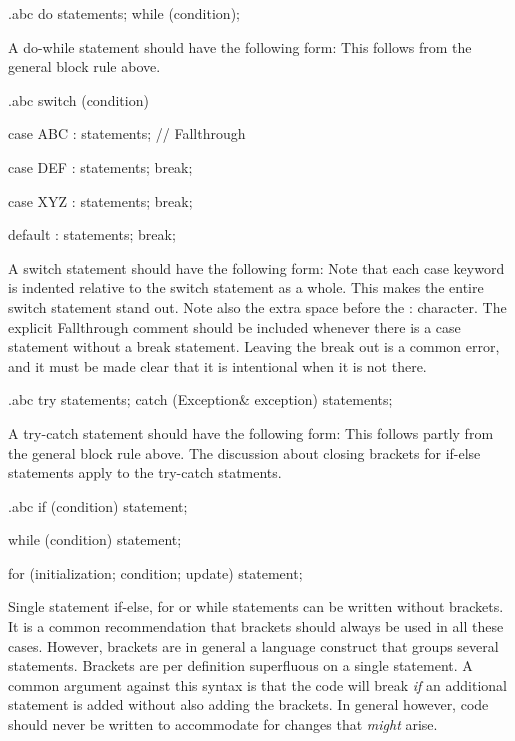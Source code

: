 \begin{filecontents*}{\jobname.abc}
	do {
	    statements;
	} while (condition);
\end{filecontents*}

\recommendation
{A do-while statement should have the following form:}
{}
{This follows from the general block rule above.}


\begin{filecontents*}{\jobname.abc}
	switch (condition) {
	    case ABC :
		    statements;
		    // Fallthrough
		
	    case DEF :
		    statements;
		    break;
		
	    case XYZ :
		    statements;
		    break;
		
	    default :
		    statements;
		    break;
	}
\end{filecontents*}

\recommendation
{A switch statement should have the following form:}
{}
{Note that each case keyword is indented relative to the switch statement as a whole. This makes the entire switch statement stand out. Note also the extra space before the : character. The explicit Fallthrough comment should be included whenever there is a case statement without a break statement. Leaving the break out is a common error, and it must be made clear that it is intentional when it is not there.}


\begin{filecontents*}{\jobname.abc}
	try {
	   statements;
	}
	catch (Exception& exception) {
	    statements;
	}
\end{filecontents*}

\recommendation
{A try-catch statement should have the following form:}
{}
{This follows partly from the general block rule above. The discussion about closing brackets for if-else statements apply to the try-catch statments.}


\begin{filecontents*}{\jobname.abc}
	if (condition)
	    statement;
	
	while (condition)
	    statement;
	
	for (initialization; condition; update)
	    statement;
\end{filecontents*}

\recommendation
{Single statement if-else, for or while statements can be written without brackets.}
{}
{It is a common recommendation that brackets should always be used in all these cases. However, brackets are in general a language construct that groups several statements. Brackets are per definition superfluous on a single statement. A common argument against this syntax is that the code will break \textit{if} an additional statement is added without also adding the brackets. In general however, code should never be written to accommodate for changes that \textit{might} arise.}


